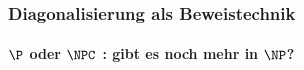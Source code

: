 \begin{frame}
	\frametitle{Diagonalisierung als Beweistechnik}
	\framesubtitle{$\P$ oder $\NPC$ : gibt es noch mehr in $\NP$?}
\end{frame}
